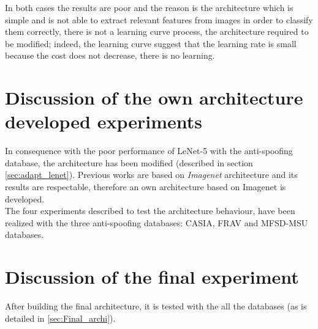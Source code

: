 In both cases the results are poor and the reason is the architecture which is simple and is not able to extract relevant features from images in order to classify them correctly, there is not a learning curve process, the architecture required to be modified; indeed, the learning curve suggest that the learning rate is small because the cost does not decrease, there is no learning.

\section{Discussion of the own architecture developed experiments}
In consequence with the poor performance of LeNet-5 with the anti-spoofing database, the architecture has been modified (described in section \ref{sec:adapt_lenet}). Previous works are based on \textit{Imagenet} architecture and its results are respectable, therefore an own architecture based on Imagenet is developed.\\

The four experiments described to test the architecture behaviour, have been realized with the three anti-spoofing databases: CASIA, FRAV and MFSD-MSU databases.\\



\section{Discussion of the final experiment}
After building the final architecture, it is tested with the all the databases (as is detailed in \ref{sec:Final_archi}).\\